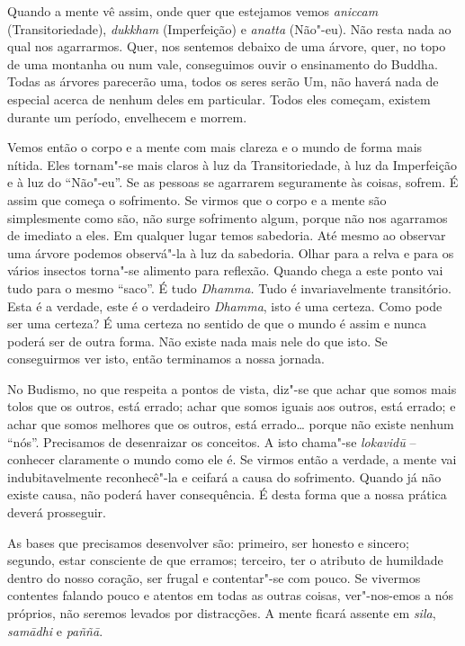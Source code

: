 Quando a mente vê assim, onde quer que estejamos vemos \emph{aniccam}
(Transitoriedade), \emph{dukkham} (Imperfeição) e \emph{anatta}
(Não"-eu). Não resta nada ao qual nos agarrarmos. Quer, nos sentemos
debaixo de uma árvore, quer, no topo de uma montanha ou num vale,
conseguimos ouvir o ensinamento do Buddha. Todas as árvores parecerão
uma, todos os seres serão Um, não haverá nada de especial acerca de
nenhum deles em particular. Todos eles começam, existem durante um
período, envelhecem e morrem.

Vemos então o corpo e a mente com mais clareza e o mundo de forma mais
nítida. Eles tornam"-se mais claros à luz da Transitoriedade, à luz da
Imperfeição e à luz do ``Não"-eu''. Se as pessoas se agarrarem
seguramente às coisas, sofrem. É assim que começa o sofrimento. Se
virmos que o corpo e a mente são simplesmente como são, não surge
sofrimento algum, porque não nos agarramos de imediato a eles. Em
qualquer lugar temos sabedoria. Até mesmo ao observar uma árvore podemos
observá"-la à luz da sabedoria. Olhar para a relva e para os vários
insectos torna"-se alimento para reflexão. Quando chega a este ponto vai
tudo para o mesmo ``saco''. É tudo \emph{Dhamma.} Tudo é invariavelmente
transitório. Esta é a verdade, este é o verdadeiro \emph{Dhamma}, isto é
uma certeza. Como pode ser uma certeza? É uma certeza no sentido de que
o mundo é assim e nunca poderá ser de outra forma. Não existe nada mais
nele do que isto. Se conseguirmos ver isto, então terminamos a nossa
jornada.

No Budismo, no que respeita a pontos de vista, diz"-se que achar que
somos mais tolos que os outros, está errado; achar que somos iguais aos
outros, está errado; e achar que somos melhores que os outros, está
errado\ldots{} porque não existe nenhum ``nós''. Precisamos de
desenraizar os conceitos. A isto chama"-se \emph{lokavidū} -- conhecer
claramente o mundo como ele é. Se virmos então a verdade, a mente vai
indubitavelmente reconhecê"-la e ceifará a causa do sofrimento. Quando já
não existe causa, não poderá haver consequência. É desta forma que a
nossa prática deverá prosseguir.

As bases que precisamos desenvolver são: primeiro, ser honesto e
sincero; segundo, estar consciente de que erramos; terceiro, ter o
atributo de humildade dentro do nosso coração, ser frugal e contentar"-se
com pouco. Se vivermos contentes falando pouco e atentos em todas as
outras coisas, ver"-nos-emos a nós próprios, não seremos levados por
distracções. A mente ficará assente em \emph{sila}, \emph{samādhi} e
\emph{paññā}.

